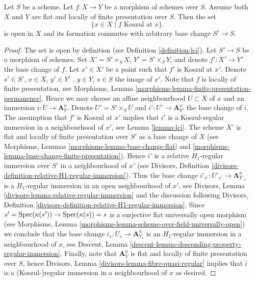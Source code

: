 \begin{lemma}
\label{lemma-base-change-lci-fibres}
Let $S$ be a scheme. Let $f : X \to Y$ be a morphism of schemes over $S$.
Assume both $X$ and $Y$ are flat and locally of finite presentation over $S$.
Then the set
$$
\{x \in X \mid f\text{ Koszul at }x\}.
$$
is open in $X$ and its formation commutes with arbitrary base change
$S' \to S$.
\end{lemma}

\begin{proof}
The set is open by definition (see
Definition \ref{definition-lci}).
Let $S' \to S$ be a morphism of schemes. Set $X' = S' \times_S X$,
$Y' = S' \times_S Y$, and denote $f' : X' \to Y'$ the base change of $f$.
Let $x' \in X'$ be a point such that $f'$ is Koszul at $x'$. Denote
$s' \in S'$, $x \in X$, $y' \in Y'$ , $y \in Y$, $s \in S$ the image
of $x'$. Note that $f$ is locally of finite presentation, see
Morphisms, Lemma \ref{morphisms-lemma-finite-presentation-permanence}.
Hence we may choose an affine neighbourhood $U \subset X$ of
$x$ and an immersion $i : U \to \mathbf{A}^n_Y$. Denote $U' = S' \times_S U$
and $i' : U' \to \mathbf{A}^n_{Y'}$ the base change of $i$.
The assumption that $f'$ is Koszul at $x'$ implies that $i'$ is a
Koszul-regular immersion in a neighbourhood of $x'$, see
Lemma \ref{lemma-lci}.
The scheme $X'$ is flat and locally of finite
presentation over $S'$ as a base change of $X$ (see
Morphisms, Lemmas \ref{morphisms-lemma-base-change-flat} and
\ref{morphisms-lemma-base-change-finite-presentation}).
Hence $i'$ is a relative $H_1$-regular immersion over $S'$
in a neighbourhood of $x'$ (see
Divisors, Definition \ref{divisors-definition-relative-H1-regular-immersion}).
Thus the base change $i'_{s'} : U'_{s'} \to \mathbf{A}^n_{Y'_{s'}}$ is
a $H_1$-regular immersion in an open neighbourhood of $x'$, see
Divisors, Lemma \ref{divisors-lemma-relative-regular-immersion}
and the discussion following
Divisors, Definition \ref{divisors-definition-relative-H1-regular-immersion}.
Since $s' = \mathop{\rm Spec}(\kappa(s')) \to \mathop{\rm Spec}(\kappa(s)) = s$
is a surjective flat universally open morphism (see
Morphisms, Lemma \ref{morphisms-lemma-scheme-over-field-universally-open})
we conclude that the base change $i_s : U_s \to \mathbf{A}^n_{Y_s}$ is an
$H_1$-regular immersion in a neighbourhood of $x$, see
Descent, Lemma \ref{descent-lemma-descending-property-regular-immersion}.
Finally, note that $\mathbf{A}^n_Y$ is flat and locally of finite
presentation over $S$, hence
Divisors, Lemma \ref{divisors-lemma-fibre-quasi-regular}
implies that $i$ is a (Koszul-)regular immersion in a neighbourhood of $x$
as desired.
\end{proof}

